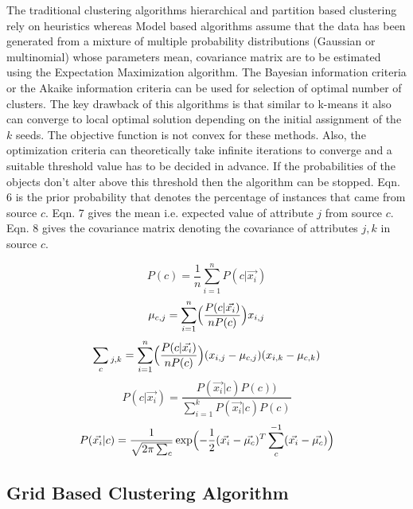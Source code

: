 The traditional clustering algorithms hierarchical and partition based clustering rely on heuristics whereas Model based algorithms assume that the data has been generated from a mixture of multiple probability distributions (Gaussian or multinomial) whose parameters mean, covariance matrix are to be estimated using the Expectation Maximization algorithm. The Bayesian information criteria or the Akaike information criteria can be used for selection of optimal number of clusters. The key drawback of this algorithms is that similar to k-means it also can converge to local optimal solution depending on the initial assignment of the $k$ seeds. The objective function is not convex for these methods. Also, the optimization criteria can theoretically take infinite iterations to converge and a suitable threshold value has to be decided in advance. If the probabilities of the objects don't alter above this threshold then the algorithm can be stopped. Eqn. 6 is the prior probability that denotes the percentage of instances that came from source $c$. Eqn. 7 gives the mean i.e. expected value of attribute $j$ from source $c$. Eqn. 8 gives the covariance matrix denoting the covariance of attributes $j,k$ in source $c$.

\begin{equation}
P(c)= \frac{1}{n} \sum_{i=1}^{n} P(c\vert\vec{x_i})
\end{equation}
\begin{equation}
\mu_{c,j} = \sum_{i=1}^{n} \Bigl(\frac{P(c\vert\vec{x_i})}{nP(c)}\Bigr)x_{i,j}
\end{equation}
\begin{equation}
\sum_{c}{\mathstrut}_{j,k} = \sum_{i=1}^{n}\Bigl(\frac{P(c\vert\vec{x_i})}{nP(c)}\Bigr)(x_{i,j} - \mu_{c,j})(x_{i,k} - \mu_{c,k})
\end{equation}
\begin{equation}
 P(c\vert\vec{x_i}) = \frac{P(\vec{x_i}\vert c)P(c))}{\sum_{i=1}^{k}P(\vec{x_i}\vert c)P(c)}
 \end{equation}
 \begin{equation}
P(\vec{x_i}|c) = \frac{1}{\sqrt{2\pi\sum_{c}}} \exp\Bigl(- \frac{1}{2}(\vec{x_i} - \vec{\mu_c})^T \sum_{c}^{-1}(\vec{x_i} - \vec{\mu_c})\Bigr)
\end{equation}

\subsection{Grid Based Clustering Algorithm}  

